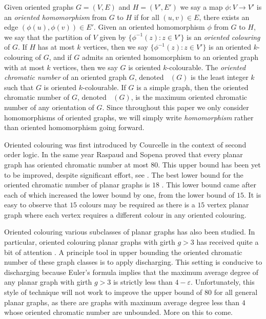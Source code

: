 \documentclass[11pt]{article}
\theoremstyle{definition}
\def\epsilon{\varepsilon}
\DeclareMathOperator{\chio}{\chi_o}
\begin{document}
Given oriented graphs $G=(V,E)$ and $H = (V',E')$ we say a map $\phi: V \rightarrow V'$ is an \emph{oriented homomorphism} from $G$ to $H$ if for all $(u,v)\in E$, there exists an edge $(\phi(u),\phi(v))\in E'$. 
Given an oriented homomorphism $\phi$ from $G$ to $H$, we say that the partition of $V$ given by $\{\phi^{-1}(z): z \in V'\}$ is an \emph{oriented colouring} of $G$. If $H$ has at most $k$ vertices, then we say $\{\phi^{-1}(z): z \in V'\}$ is an oriented $k$-colouring of $G$, and if $G$ admits an oriented homomorphism to an oriented graph with at most $k$ vertices, then we say $G$ is oriented $k$-colourable. The \emph{oriented chromatic number} of an oriented graph $G$, denoted $\chio(G)$ is the least integer $k$ such that $G$ is oriented $k$-colourable. If $G$ is a simple graph, then the oriented chromatic number of $G$, denoted $\chio(G)$, is the maximum oriented chromatic number of any orientation of $G$.
Since throughout this paper we only consider homomorphisms of oriented graphs, we will simply write \emph{homomorphism} rather than oriented homomorphism 
going forward.

Oriented colouring was first introduced by Courcelle \cite{courcelle1994monadic} in the context of second order logic. In the same year Raspaud and Sopena \cite{raspaud1994good} proved that every planar graph has oriented chromatic number at most $80$. 
This upper bound has been yet to be improved, despite significant effort, see \cite{sopena2016homomorphisms}.
The best lower bound for the oriented chromatic number of planar graphs is $18$  \cite{marshall2015oriented}.
This lower bound came after \cite{marshall2007homomorphism, sopena2002there} each of which increased the lower bound by one,
from the lower bound of $15$. 
It is easy to observe that $15$ colours may be required
as there is a $15$ vertex planar graph where each vertex requires a different colour in any oriented colouring.

Oriented colouring various subclasses of planar graphs has also been studied.
In particular, oriented colouring planar graphs with girth $g>3$ 
has received quite a bit of attention \cite{borodin2007oriented,borodin2005oriented, borodin1999maximum,  marshall2013homomorphism, nevsetvril1997colorings, ochem2008oriented, ochem2014oriented, pinlou2009oriented}.
A principle tool in upper bounding the oriented chromatic number of these graph classes is to apply discharging.
This setting is conducive to discharging because 
Euler's formula implies that the maximum average degree of any planar graph with girth $g> 3$ is strictly less than $4-\epsilon$.
Unfortunately, this style of technique will not work to improve the upper bound of $80$ for all general planar graphs,
as there are graphs with maximum average degree less than $4$
whose oriented chromatic number are unbounded.
More on this to come.
\end{document}
